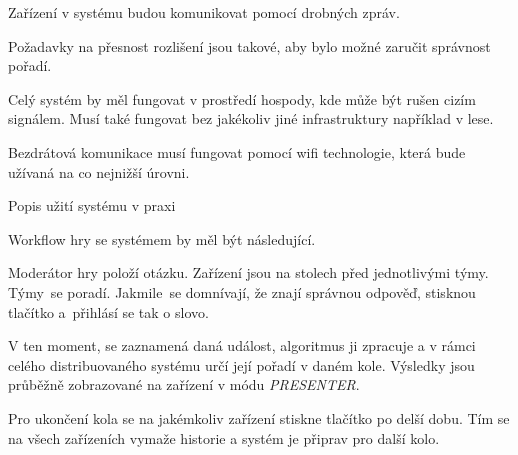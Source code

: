 Zařízení v systému budou komunikovat pomocí drobných zpráv.

Požadavky na přesnost rozlišení jsou takové, aby bylo možné zaručit správnost pořadí.

Celý systém by měl fungovat v prostředí hospody, kde může být rušen cizím signálem. Musí také fungovat bez jakékoliv jiné infrastruktury například v lese.

Bezdrátová komunikace musí fungovat pomocí wifi technologie, která bude užívaná na co nejnižší úrovni.

\sec Popis užití systému v praxi

Workflow hry se systémem by měl být následující.

Moderátor hry položí otázku. Zařízení jsou na stolech před jednotlivými týmy. Týmy~se poradí. Jakmile~se domnívají, že znají správnou odpověď, stisknou tlačítko a~přihlásí se tak o slovo.

V ten moment, se zaznamená daná událost, algoritmus ji zpracuje a v rámci celého distribuovaného systému určí její pořadí v daném kole. Výsledky jsou průběžně zobrazované na zařízení v módu {\em PRESENTER}.

Pro ukončení kola se na jakémkoliv zařízení stiskne tlačítko po delší dobu. Tím se na všech zařízeních vymaže historie a systém je připrav pro další kolo.

